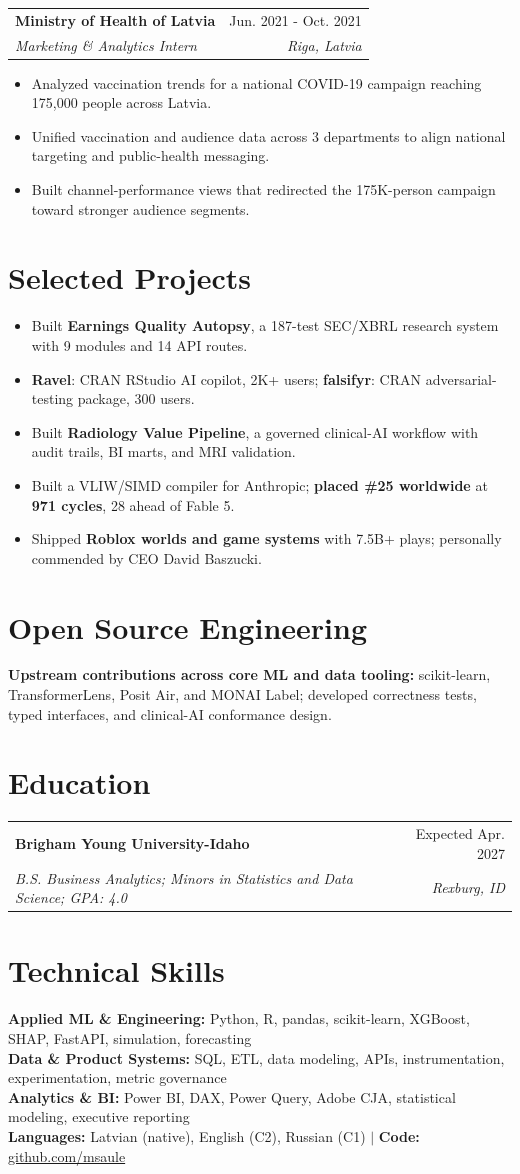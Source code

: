 \documentclass[letterpaper,10pt]{article}
\makeatletter
\newcommand{\role}[4]{%
  \vspace{4pt}
  \begin{tabular*}{\textwidth}{@{}l@{\extracolsep{\fill}}r@{}}
    \textbf{#1} & \textcolor{meta}{#2} \\
    \textit{#3} & \textit{\textcolor{meta}{#4}} \\
  \end{tabular*}\vspace{-2pt}
}
\newcommand{\bulletlist}{%
  \begin{itemize}[
    leftmargin=0.17in,
    label={\raisebox{0.15ex}{\small -}},
    itemsep=2.1pt,
    topsep=2pt,
    parsep=0pt,
    partopsep=0pt
  ]
}
\newcommand{\bulletlistend}{\end{itemize}\vspace{3.5pt}}
\newcommand{\rbullet}[1]{\item \fontsize{9.6}{12.1}\selectfont #1}
\newcommand{\compactline}[1]{{\fontsize{9.65}{12.2}\selectfont #1}}
\makeatother
\begin{document}
\role{Ministry of Health of Latvia}{Jun. 2021 - Oct. 2021}{Marketing \& Analytics Intern}{Riga, Latvia}
\bulletlist
\rbullet{Analyzed vaccination trends for a national COVID-19 campaign reaching 175,000 people across Latvia.}
\rbullet{Unified vaccination and audience data across 3 departments to align national targeting and public-health messaging.}
\rbullet{Built channel-performance views that redirected the 175K-person campaign toward stronger audience segments.}
\bulletlistend

\section{Selected Projects}
\bulletlist
\rbullet{Built \textbf{Earnings Quality Autopsy}, a 187-test SEC/XBRL research system with 9 modules and 14 API routes.}
\rbullet{\textbf{Ravel}: CRAN RStudio AI copilot, 2K+ users; \textbf{falsifyr}: CRAN adversarial-testing package, 300 users.}
\rbullet{Built \textbf{Radiology Value Pipeline}, a governed clinical-AI workflow with audit trails, BI marts, and MRI validation.}
\rbullet{Built a VLIW/SIMD compiler for Anthropic; \textbf{placed \#25 worldwide} at \textbf{971 cycles}, 28 ahead of Fable 5.}
\rbullet{Shipped \textbf{Roblox worlds and game systems} with 7.5B+ plays; personally commended by CEO David Baszucki.}
\bulletlistend

\section{Open Source Engineering}
\compactline{\textbf{Upstream contributions across core ML and data tooling:} scikit-learn, TransformerLens, Posit Air, and MONAI Label; developed correctness tests, typed interfaces, and clinical-AI conformance design.}

\section{Education}
\role{Brigham Young University-Idaho}{Expected Apr. 2027}{B.S. Business Analytics; Minors in Statistics and Data Science; GPA: 4.0}{Rexburg, ID}

\section{Technical Skills}
\compactline{\textbf{Applied ML \& Engineering:} Python, R, pandas, scikit-learn, XGBoost, SHAP, FastAPI, simulation, forecasting}\\[0.4pt]
\compactline{\textbf{Data \& Product Systems:} SQL, ETL, data modeling, APIs, instrumentation, experimentation, metric governance}\\[0.4pt]
\compactline{\textbf{Analytics \& BI:} Power BI, DAX, Power Query, Adobe CJA, statistical modeling, executive reporting}\\[1.2pt]
\compactline{\textbf{Languages:} Latvian (native), English (C2), Russian (C1) $\mid$ \textbf{Code:} \href{https://github.com/msaule}{github.com/msaule}}
\end{document}
